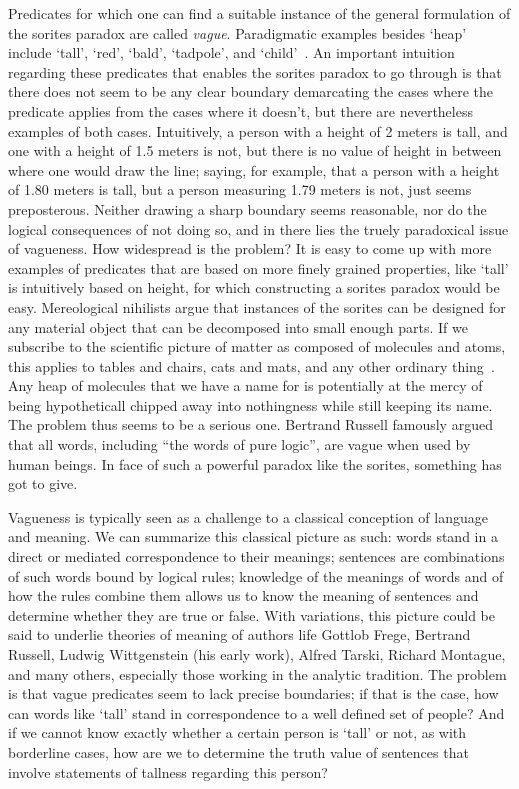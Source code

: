 \documentclass[a4paper]{article}
\begin{document}
Predicates for which one can find a suitable instance of the general formulation of the sorites paradox are called \emph{vague}.
Paradigmatic examples besides `heap' include `tall', `red', `bald', `tadpole', and `child'~\parencite{Keefe1997}.
An important intuition regarding these predicates that enables the sorites paradox to go through is that there does not seem to be any clear boundary demarcating the cases where the predicate applies from the cases where it doesn't, but there are nevertheless examples of both cases.
Intuitively, a person with a height of 2 meters is tall, and one with a height of 1.5 meters is not, but there is no value of height in between where one would draw the line; saying, for example, that a person with a height of 1.80 meters is tall, but a person measuring 1.79 meters is not, just seems preposterous.
Neither drawing a sharp boundary seems reasonable, nor do the logical consequences of not doing so, and in there lies the truely paradoxical issue of vagueness.
How widespread is the problem?
It is easy to come up with more examples of predicates that are based on more finely grained properties, like `tall' is intuitively based on height, for which constructing a sorites paradox would be easy.
Mereological nihilists argue that instances of the sorites can be designed for any material object that can be decomposed into small enough parts.
If we subscribe to the scientific picture of matter as composed of molecules and atoms, this applies to tables and chairs, cats and mats, and any other ordinary thing~\parencite{Unger1979}.
Any heap of molecules that we have a name for is potentially at the mercy of being hypotheticall chipped away into nothingness while still keeping its name.
The problem thus seems to be a serious one.
Bertrand Russell famously argued~\parencite*{russell_vagueness_1923} that all words, including ``the words of pure logic'', are vague when used by human beings.
In face of such a powerful paradox like the sorites, something has got to give.

Vagueness is typically seen as a challenge to a classical conception of language and meaning.
We can summarize this classical picture as such: words stand in a direct or mediated correspondence to their meanings; sentences are combinations of such words bound by logical rules; knowledge of the meanings of words and of how the rules combine them allows us to know the meaning of sentences and determine whether they are true or false.
With variations, this picture could be said to underlie theories of meaning of authors life Gottlob Frege, Bertrand Russell, Ludwig Wittgenstein (his early work), Alfred Tarski, Richard Montague, and many others, especially those working in the analytic tradition.
The problem is that vague predicates seem to lack precise boundaries; if that is the case, how can words like `tall' stand in correspondence to a well defined set of people?
And if we cannot know exactly whether a certain person is `tall' or not, as with borderline cases, how are we to determine the truth value of sentences that involve statements of tallness regarding this person?
\end{document}
